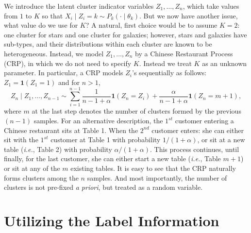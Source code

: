 We introduce the latent cluster indicator variables $Z_1, \dots, Z_n$, which take values from $1$ to $K$ so that $X_i \mid Z_i = k  \sim P_k( \cdot \mid \theta_k).$ But we now have another issue, what value do we use for $K$? A natural, first choice would be to assume $K=2$: one cluster for stars and one cluster for galaxies; however, stars and galaxies have sub-types, and their distributions within each cluster are known to be heterogeneous. Instead, we model $Z_1, \dots, Z_n$ by a Chinese Restaurant Process (CRP), in which we do not need to specify $K$. Instead we treat $K$ as an unknown parameter. In particular, a CRP models $Z_i$'s sequentially as follows: $Z_1 =  \mathbf{1}(Z_1 = 1)$ and for $n > 1$,
\[
Z_{n} \mid Z_1, \dots, Z_{n-1} \sim  \sum_{i=1}^{n-1} \frac{1}{n-1 + \alpha} \mathbf{1}(Z_n = Z_i) + \frac{\alpha}{n-1+ \alpha} \mathbf{1}(Z_n = m+1), 
\]
where $m$ at the last step denotes the number of clusters formed by the previous $(n-1)$ samples. For an alternative description, the $1^{st}$ customer entering a Chinese restaurant sits at Table 1. When the $2^{nd}$ customer enters: she can either sit with the $1^{st}$ customer at Table 1 with probability $1/(1 + \alpha)$, or sit at a new table (\textit{i.e.}, Table 2)  with probability $\alpha / ( 1 + \alpha)$. This process continues, until finally, for the last customer, she can either start a new table (\textit{i.e.}, Table $m+1$) or sit at any of the $m$ existing tables. It is easy to see that the CRP naturally forms clusters among the $n$ samples. And most importantly, the number of clusters is not pre-fixed \textit{a priori}, but treated as a random variable. 

\section{Utilizing the Label Information}

